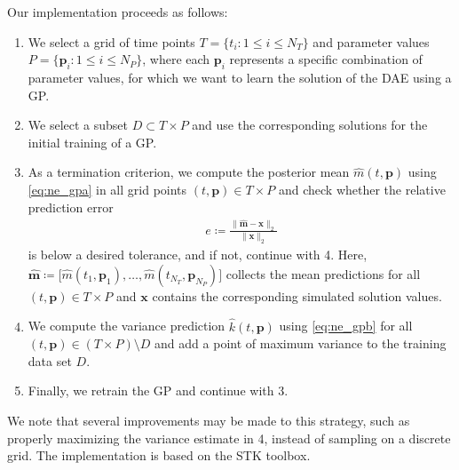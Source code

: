 \documentclass[AMA,STIX1COL]{WileyNJD-v2}
\newcommand{\mb}[1]{\mathbf{#1}}
\newcommand{\mbh}[1]{\hat{\mathbf{#1}}}
\begin{document}
Our implementation proceeds as follows:
\begin{enumerate}
    \item We select a grid of time points $T = \{ t_i: 1 \leq i \leq N_T \}$ and parameter values $P = \{ \mb{p}_i: 1 \leq i \leq N_P \}$, where each $\mb{p}_i$ represents a specific combination of parameter values, for which we want to learn the solution of the DAE using a GP.
    \item We select a subset $D \subset T \times P$ and use the corresponding solutions for the initial training of a GP.
    \item As a termination criterion, we compute the posterior mean $\hat{m}(t, \mb{p})$ using \eqref{eq:ne_gpa} in all grid points $(t, \mb{p}) \in T \times P$ and check whether the relative prediction error
    \begin{align*}
        e \coloneqq \frac{\| \mbh{m} - \mb{x} \|_2}{ \| \mb{x} \|_2}
    \end{align*}
    is below a desired tolerance, and if not, continue with 4. Here, $\mbh{m} \coloneqq \big[ \hat{m}(t_1, \mb{p}_1), \dotsc, \hat{m}(t_{N_T}, \mb{p}_{N_P}) \big]$ collects the mean predictions for all $(t, \mb{p}) \in T \times P$ and $\mb{x}$ contains the corresponding simulated solution values.
    \item We compute the variance prediction $\hat{k}(t, \mb{p})$ using \eqref{eq:ne_gpb} for all $(t, \mb{p}) \in (T \times P) \setminus D$ and add a point of maximum variance to the training data set $D$.
    \item Finally, we retrain the GP and continue with 3.
\end{enumerate}

We note that several improvements may be made to this strategy, such as properly maximizing the variance estimate in 4, instead of sampling on a discrete grid. The implementation is based on the STK toolbox\cite{stk}.
\end{document}
